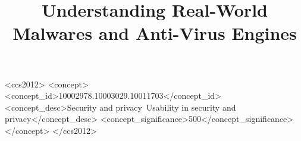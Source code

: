 \documentclass[sigconf, anonymous]{acmart}
\begin{document}
\title{Understanding Real-World Malwares and Anti-Virus Engines} %



\begin{abstract}

\end{abstract}




\begin{CCSXML}
<ccs2012>
<concept>
<concept_id>10002978.10003029.10011703</concept_id>
<concept_desc>Security and privacy~Usability in security and privacy</concept_desc>
<concept_significance>500</concept_significance>
</concept>
</ccs2012>
\end{CCSXML}



\maketitle









%





\end{document}
